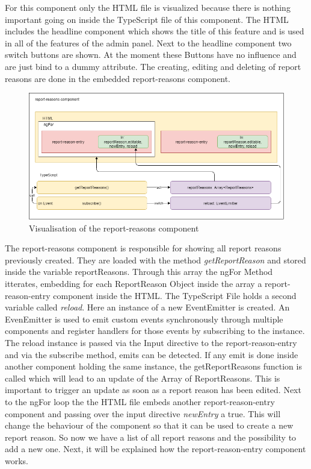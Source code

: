 For this component only the HTML file is visualized because there is nothing important going on inside the TypeScript
file of this component.
The HTML includes the headline component which shows the title of this feature and is used in all of the features of
the admin panel.
Next to the headline component two switch buttons are shown.
At the moment these Buttons have no influence and are just bind to a dummy attribute.
The creating, editing and deleting of report reasons are done in the embedded report-reasons component.

\begin{figure}[h]
    \centering
    \includegraphics[width=1.0\textwidth]{./images/report_reasons_2}
    \caption{Visualisation of the report-reasons component}
    \label{fig:reportreason}
\end{figure}
\vspace{5mm}

The report-reasons component is responsible for showing all report reasons previously created.
They are loaded with the method \textit{getReportReason} and stored inside the variable reportReasons.
Through this array the ngFor Method itterates, embedding for each ReportReason Object inside the array a
report-reason-entry component inside the HTML.
The TypeScript File holds a second variable called \textit{reload}.
Here an instance of a new EventEmitter is created.
An EvenEmitter is used to emit custom events synchronously through multiple components and register handlers for
those events by subscribing to the instance.
The reload instance is passed via the Input directive to the report-reason-entry and via the subscribe method,
emits can be detected.
If any emit is done inside another component holding the same instance, the getReportReasons function is called which
will lead to an update of the Array of ReportReasons.
This is important to trigger an update as soon as a report reason has been edited.
Next to the ngFor loop the the HTML file embeds another report-reason-entry component and passing over the input
directive \textit{newEntry} a true.
This will change the behaviour of the component so that it can be used to create a new report reason.
So now we have a list of all report reasons and the possibility to add a new one.
Next, it will be explained how the report-reason-entry component works.

